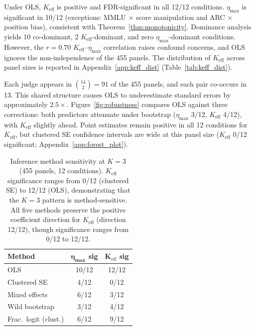 Under OLS, $K_{\mathrm{eff}}$ is positive and FDR-significant in all 12/12 conditions. $\eta_{\max}$ is significant in 10/12 (exceptions: MMLU $\times$ score manipulation and ARC $\times$ position bias), consistent with Theorem~\ref{thm:monotonicity}. Dominance analysis yields 10 co-dominant, 2 $K_{\mathrm{eff}}$-dominant, and zero $\eta_{\max}$-dominant conditions. However, the $r = 0.70$ $K_{\mathrm{eff}}$--$\eta_{\max}$ correlation raises confound concerns, and OLS ignores the non-independence of the 455 panels. The distribution of $K_{\mathrm{eff}}$ across panel sizes is reported in Appendix~\ref{app:keff_dist} (Table~\ref{tab:keff_dist}).

Each judge appears in $\binom{14}{2} = 91$ of the 455 panels, and each pair co-occurs in 13. This shared structure causes OLS to underestimate standard errors by approximately $2.5{\times}$. Figure~\ref{fig:robustness} compares OLS against three corrections: both predictors attenuate under bootstrap ($\eta_{\max}$ 3/12, $K_{\mathrm{eff}}$ 4/12), with $K_{\mathrm{eff}}$ slightly ahead. Point estimates remain positive in all 12 conditions for $K_{\mathrm{eff}}$, but clustered SE confidence intervals are wide at this panel size ($K_{\mathrm{eff}}$ 0/12 significant; Appendix~\ref{app:forest_plot}).

\begin{table}[t]
\centering
\small
\begin{tabular}{lcc}
\toprule
\textbf{Method} & $\boldsymbol{\eta_{\max}}$ \textbf{sig} & $\boldsymbol{K_{\mathrm{eff}}}$ \textbf{sig} \\
\midrule
OLS                    & 10/12 & 12/12 \\
Clustered SE           & 4/12  & 0/12  \\
Mixed effects          & 6/12  & 3/12  \\
Wild bootstrap         & 3/12  & 4/12  \\
Frac.\ logit (clust.)  & 6/12  & 9/12  \\
\bottomrule
\end{tabular}
\caption{Inference method sensitivity at $K{=}3$ (455 panels, 12 conditions). $K_{\mathrm{eff}}$ significance ranges from 0/12 (clustered SE) to 12/12 (OLS), demonstrating that the $K{=}3$ pattern is method-sensitive. All five methods preserve the positive coefficient direction for $K_{\mathrm{eff}}$ (direction 12/12), though significance ranges from 0/12 to 12/12.}
\label{tab:method_comparison}
\end{table}

